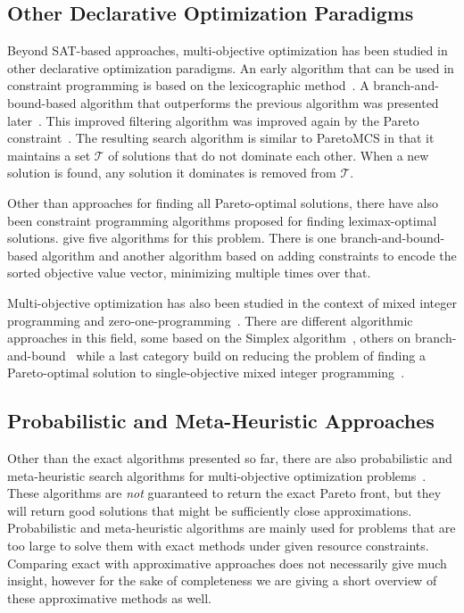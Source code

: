 \subsection{Other Declarative Optimization Paradigms\label{sec:other-approaches}}

Beyond SAT-based approaches, multi-objective optimization has been studied in other declarative optimization paradigms.
An early algorithm that can be used in constraint programming is based on the lexicographic method~\autocite{Wassenhove1980}.
A branch-and-bound-based algorithm that outperforms the previous algorithm was presented later~\autocite{DBLP:conf/ecai/Gavanelli02}.
This improved filtering algorithm was improved again by the Pareto constraint~\autocite{DBLP:conf/cp/SchausH13,DBLP:conf/aaai/HartertS14}.
The resulting search algorithm is similar to ParetoMCS in that it maintains a set $\mathcal{T}$ of solutions that do not dominate each other.
When a new solution is found, any solution it dominates is removed from $\mathcal{T}$.

Other than approaches for finding all Pareto-optimal solutions, there have also been constraint programming algorithms proposed for finding leximax-optimal solutions.
\Textcite{DBLP:journals/ai/BouveretL09} give five algorithms for this problem.
There is one branch-and-bound-based algorithm and another algorithm based on adding constraints to encode the sorted objective value vector, minimizing multiple times over that.

Multi-objective optimization has also been studied in the context of mixed integer programming and zero-one-programming~\autocites{Ehrgott2005-6,Rasmussen1986,DBLP:journals/eor/AlvesC07}.
There are different algorithmic approaches in this field, some based on the Simplex algorithm~\autocites{Ehrgott2005-7,DBLP:journals/mp/EvansS73}, others on branch-and-bound~\autocites{Adelgren2021,DBLP:journals/siamjo/SantisENR20} while a last category build on reducing the problem of finding a Pareto-optimal solution to single-objective mixed integer programming~\autocites{DBLP:journals/jota/Sun17,DBLP:journals/ol/LuMS20,Soland1979}.

\subsection{Probabilistic and Meta-Heuristic Approaches\label{sec:approximative}}

Other than the exact algorithms presented so far, there are also probabilistic and meta-heuristic search algorithms for multi-objective optimization problems~\autocite{Saini2021}.
These algorithms are \emph{not} guaranteed to return the exact Pareto front, but they will return good solutions that might be sufficiently close approximations.
Probabilistic and meta-heuristic algorithms are mainly used for problems that are too large to solve them with exact methods under given resource constraints.
Comparing exact with approximative approaches does not necessarily give much insight, however for the sake of completeness we are giving a short overview of these approximative methods as well.

